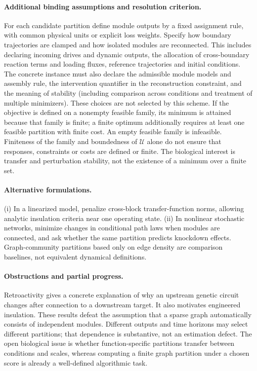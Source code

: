 \documentclass[11pt]{article}
\begin{document}
\paragraph{Additional binding assumptions and resolution criterion.} For each candidate partition define module outputs by a fixed assignment rule, with common physical units or explicit loss weights. Specify how boundary trajectories are clamped and how isolated modules are reconnected. This includes declaring incoming drives and dynamic outputs, the allocation of cross-boundary reaction terms and loading fluxes, reference trajectories and initial conditions. The concrete instance must also declare the admissible module models and assembly rule, the intervention quantifier in the reconstruction constraint, and the meaning of stability (including comparison across conditions and treatment of multiple minimizers). These choices are not selected by this scheme. If the objective is defined on a nonempty feasible family, its minimum is attained because that family is finite; a finite optimum additionally requires at least one feasible partition with finite cost. An empty feasible family is infeasible. Finiteness of the family and boundedness of $\mathcal U$ alone do not ensure that responses, constraints or costs are defined or finite. The biological interest is transfer and perturbation stability, not the existence of a minimum over a finite set.

\paragraph{Alternative formulations.} (i) In a linearized model, penalize cross-block transfer-function norms, allowing analytic insulation criteria near one operating state. (ii) In nonlinear stochastic networks, minimize changes in conditional path laws when modules are connected, and ask whether the same partition predicts knockdown effects. Graph-community partitions based only on edge density are comparison baselines, not equivalent dynamical definitions.
\paragraph{Obstructions and partial progress.} Retroactivity gives a concrete explanation of why an upstream genetic circuit changes after connection to a downstream target. It also motivates engineered insulation. These results defeat the assumption that a sparse graph automatically consists of independent modules. Different outputs and time horizons may select different partitions; that dependence is substantive, not an estimation defect. The open biological issue is whether function-specific partitions transfer between conditions and scales, whereas computing a finite graph partition under a chosen score is already a well-defined algorithmic task.
\end{document}
